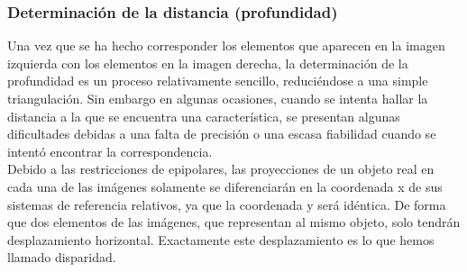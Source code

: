 \subsubsection{Determinación de la distancia (profundidad)}
Una vez que se ha hecho corresponder los elementos que aparecen en la imagen izquierda con los elementos en la imagen derecha, la determinación de la profundidad es un proceso relativamente sencillo, reduciéndose a una simple triangulación. Sin embargo en algunas ocasiones, cuando se intenta hallar la distancia a la que se encuentra una característica, se presentan algunas dificultades debidas a una falta de precisión o una escasa fiabilidad cuando se intentó encontrar la correspondencia.
\\
Debido a las restricciones de epipolares, las proyecciones de un objeto real en cada una de las imágenes solamente se diferenciarán en la coordenada x de sus sistemas de referencia relativos, ya que la coordenada y será idéntica. De forma que dos elementos de las imágenes, que representan al mismo objeto, solo tendrán desplazamiento horizontal. Exactamente este desplazamiento es lo que hemos llamado disparidad.
